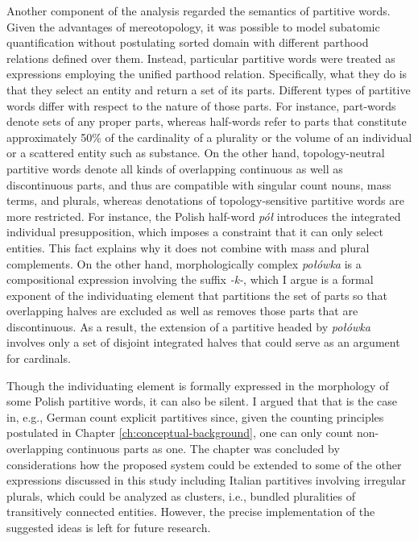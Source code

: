 	Another component of the analysis regarded the semantics of partitive words. Given the advantages of mereotopology, it was possible to model subatomic quantification without postulating sorted domain with different parthood relations defined over them. Instead, particular partitive words were treated as expressions employing the unified parthood relation. Specifically, what they do is that they select an entity and return a set of its parts. Different types of partitive words differ with respect to the nature of those parts. For instance, part-words denote sets of any proper parts, whereas half-words refer to parts that constitute approximately 50\% of the cardinality of a plurality or the volume of an  individual or a scattered entity such as substance. On the other hand, topology-neutral partitive words denote all kinds of overlapping continuous as well as discontinuous parts, and thus are compatible with singular count nouns, mass terms, and plurals, whereas denotations of topology-sensitive partitive words are more restricted. For instance, the Polish half-word \textit{pół} introduces the integrated individual presupposition, which imposes a constraint that it can only select  entities. This fact explains why it does not combine with mass and plural complements. On the other hand, morphologically complex \textit{połówka} is a compositional expression involving the suffix \textit{-k-}, which I argue is a formal exponent of the individuating element that partitions the set of parts so that overlapping halves are excluded as well as removes those parts that are discontinuous. As a result, the extension of a partitive headed by \textit{połówka} involves only a set of disjoint integrated halves that could serve as an argument for cardinals. 
	
	Though the individuating element is formally expressed in the morphology of some Polish partitive words, it can also be silent. I argued that that is the case in, e.g., German count explicit partitives since, given the counting principles postulated in Chapter \ref{ch:conceptual-background}, one can only count non-overlapping continuous parts as one. The chapter was concluded by considerations how the proposed system could be extended to some of the other expressions discussed in this study including Italian partitives involving irregular plurals, which could be analyzed as clusters, i.e., bundled pluralities of transitively connected entities. However, the precise implementation of the suggested ideas is left for future research.
